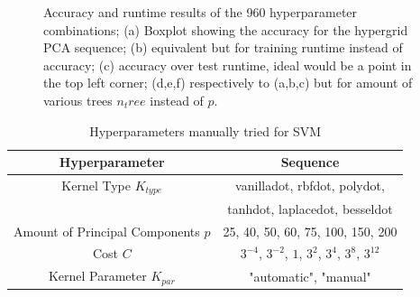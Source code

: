 \documentclass[conference]{IEEEtran}
\begin{document}
\begin{figure}[ht!]
    \quad
    \quad
    \quad

    \caption{
        \color{til}
        Accuracy and runtime results of the 960 hyperparameter combinations; (a) Boxplot showing the accuracy for the hypergrid PCA sequence; (b) equivalent but for training runtime instead of accuracy; (c) accuracy over test runtime, ideal would be a point in the top left corner; (d,e,f) respectively to (a,b,c) but for amount of various trees $n_tree$ instead of $p$.
    }
    \label{fig:hyper:pca}
\end{figure}
\begin{table}[htbp]
    \color{maxim}
    \caption{\color{maxim}Hyperparameters manually tried for SVM}
    \begin{center}
    \begin{tabular}{|c|c|}
        \hline
        \textbf{Hyperparameter} & \textbf{Sequence} \\
        \hline
        Kernel Type $K_{type}$ & vanilladot, rbfdot, polydot,\\ 
        & tanhdot, laplacedot, besseldot\\
        \hline
        Amount of Principal Components $p$ & 25, 40, 50, 60, 75, 100, 150, 200\\
        \hline
        Cost $ C $ & $3^{-4}$, $3^{-2}$, $1$, $3^2$, $3^4$, $3^8$, $3^{12}$ \\
        \hline
        Kernel Parameter $K_{par}$ & "automatic", "manual"\\
        \hline
    \end{tabular}
    \label{table:gridParamSVM}
    \end{center}
\end{table}
\end{document}

